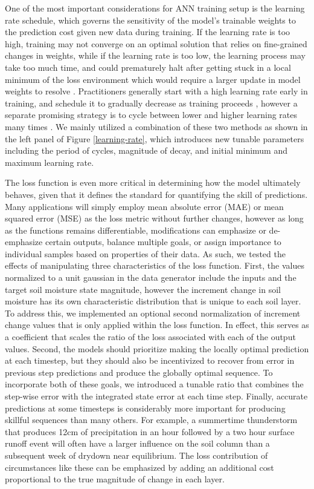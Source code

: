 One of the most important considerations for ANN training setup is the learning rate schedule, which governs the sensitivity of the model's trainable weights to the prediction cost given new data during training. If the learning rate is too high, training may not converge on an optimal solution that relies on fine-grained changes in weights, while if the learning rate is too low, the learning process may take too much time, and could prematurely halt after getting stuck in a local minimum of the loss environment which would require a larger update in model weights to resolve \citep{russell_artificial_2020}. Practitioners generally start with a high learning rate early in training, and schedule it to gradually decrease as training proceeds \citep{ren_understanding_2024}, however a separate promising strategy is to cycle between lower and higher learning rates many times \citep{smith_cyclical_2017}. We mainly utilized a combination of these two methods as shown in the left panel of Figure \ref{learning-rate}, which introduces new tunable parameters including the period of cycles, magnitude of decay, and initial minimum and maximum learning rate.

The loss function is even more critical in determining how the model ultimately behaves, given that it defines the standard for quantifying the skill of predictions. Many applications will simply employ mean absolute error (MAE) or mean squared error (MSE) as the loss metric without further changes, however as long as the functions remains differentiable, modifications can emphasize or de-emphasize certain outputs, balance multiple goals, or assign importance to individual samples based on properties of their data. As such, we tested the effects of manipulating three characteristics of the loss function. First, the values normalized to a unit gaussian in the data generator include the inputs and the target soil moisture state magnitude, however the increment change in soil moisture has its own characteristic distribution that is unique to each soil layer. To address this, we implemented an optional second normalization of increment change values that is only applied within the loss function. In effect, this serves as a coefficient that scales the ratio of the loss associated with each of the output values. Second, the models should prioritize making the locally optimal prediction at each timestep, but they should also be incentivized to recover from error in previous step predictions and produce the globally optimal sequence. To incorporate both of these goals, we introduced a tunable ratio that combines the step-wise error with the integrated state error at each time step. Finally, accurate predictions at some timesteps is considerably more important for producing skillful sequences than many others. For example, a summertime thunderstorm that produces 12cm of precipitation in an hour followed by a two hour surface runoff event will often have a larger influence on the soil column than a subsequent week of drydown near equilibrium. The loss contribution of circumstances like these can be emphasized by adding an additional cost proportional to the true magnitude of change in each layer.

